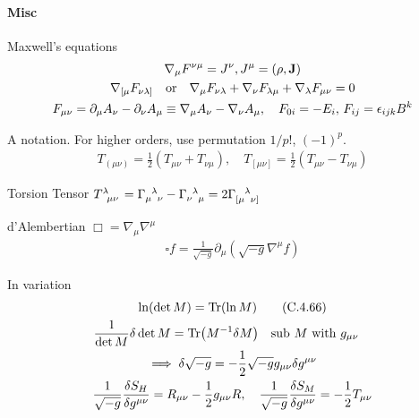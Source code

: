 \documentclass[main]{subfiles}
\begin{document}
\paragraph{Misc}
\begin{multicols}{2}
    Maxwell's equations
    \begin{gather}
        \nabla_\mu F^{\nu\mu} = J^\nu, J^\mu = (\rho, \vb{J})
        \\
        \nabla_{[\mu} F_{\nu\lambda]} \qq{or} \nabla_\mu F_{\nu\lambda} + \nabla_\nu F_{\lambda\mu} + \nabla_\lambda F_{\mu\nu} = 0
        \\
        F_{\mu\nu} = \partial_\mu A_\nu - \partial_{\nu}A_\mu \equiv \nabla_\mu A_\nu - \nabla_{\nu}A_\mu,\notag
        \quad
        F_{0i} = -E_i,\, F_{ij} = \epsilon_{ijk}B^{k}
    \end{gather}

    A notation. For higher orders, use permutation $1/p!$, $(-1)^p$.
    \begin{align}
        T_{(\mu\nu)} = \frac{1}{2} (T_{\mu\nu} + T_{\nu\mu})
        ,\quad T_{[\mu\nu]} = \frac{1}{2} (T_{\mu\nu} - T_{\nu\mu})
    \end{align}

    Torsion Tensor $T\indices{^\lambda_\mu_\nu} = 
    \Gamma\indices{_\mu^\lambda_\nu} - 
    \Gamma\indices{_\nu^\lambda_\mu} =
    2\Gamma\indices{_{[\mu}^\lambda_{\nu]}}$

    d'Alembertian $\Box = \nabla_\mu \nabla^\mu$
    \begin{align}
        \square f = \frac{1}{\sqrt{-g}} \partial_\mu (\sqrt{-g} \nabla^\mu f)
    \end{align}

    In variation
    \begin{gather}
        \ln(\det M) = \Tr(\ln M) \tag{C.4.66}
        \\
        \frac{1}{\det M} \delta \det M = \Tr(M^{-1} \delta M) \qq{sub $M$ with $g_{\mu\nu}$}
        \\
        \implies \delta\sqrt{-g} = -\frac{1}{2} \sqrt{-g} g_{\mu\nu}\delta g^{\mu\nu}
        \\
        \frac{1}{\sqrt{-g}}\fdv{S_H}{g^{\mu\nu}} = R_{\mu\nu} - \frac{1}{2}g_{\mu\nu} R,\quad \frac{1}{\sqrt{-g}}\fdv{S_M}{g^{\mu\nu}} = -\frac{1}{2}T_{\mu\nu}
    \end{gather}
\end{multicols}

\newpage
\end{document}
